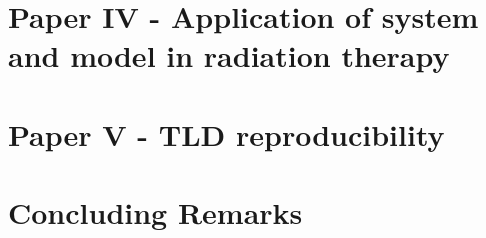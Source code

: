 \documentclass[letterpaper,12pt,twoside,openright]{report} %
\begin{document}
\chapter{Paper IV - Application of system and model in radiation therapy}

\printbibliography[heading=subbibliography]

\chapter{Paper V - TLD reproducibility}

\printbibliography[heading=subbibliography]

\chapter{Concluding Remarks}

\printbibliography[heading=subbibliography]



\end{document}
